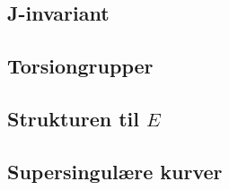 

\label{Elementer i elliptisk kurve}


\subsection{J-invariant}


\subsection{Torsiongrupper}


\subsection{Strukturen til $E$}



\subsection{Supersingulære kurver}
